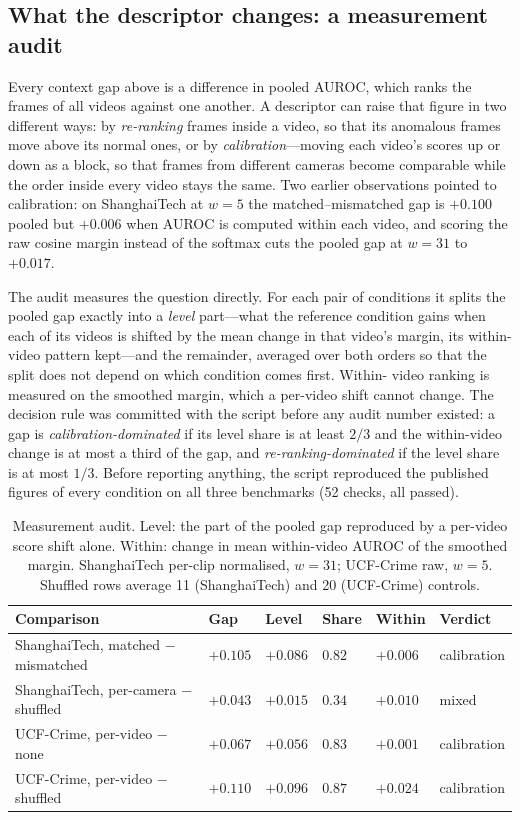 \documentclass[a4paper,fleqn]{cas-sc}
\begin{document}
\subsection{What the descriptor changes: a measurement audit}
\label{sec:res-audit}
Every context gap above is a difference in pooled AUROC, which ranks the frames
of all videos against one another. A descriptor can raise that figure in two
different ways: by \emph{re-ranking} frames inside a video, so that its
anomalous frames move above its normal ones, or by \emph{calibration}---moving
each video's scores up or down as a block, so that frames from different cameras
become comparable while the order inside every video stays the same. Two earlier
observations pointed to calibration: on ShanghaiTech at $w{=}5$ the
matched--mismatched gap is $+0.100$ pooled but $+0.006$ when AUROC is computed
within each video, and scoring the raw cosine margin instead of the softmax cuts
the pooled gap at $w{=}31$ to $+0.017$.

The audit measures the question directly. For each pair of conditions it splits
the pooled gap exactly into a \emph{level} part---what the reference condition
gains when each of its videos is shifted by the mean change in that video's
margin, its within-video pattern kept---and the remainder, averaged over both
orders so that the split does not depend on which condition comes first. Within-
video ranking is measured on the smoothed margin, which a per-video shift cannot
change. The decision rule was committed with the script before any audit number
existed: a gap is \emph{calibration-dominated} if its level share is at least
$2/3$ and the within-video change is at most a third of the gap, and
\emph{re-ranking-dominated} if the level share is at most $1/3$. Before
reporting anything, the script reproduced the published figures of every
condition on all three benchmarks (52 checks, all passed).

\begin{table}[width=\linewidth,cols=6,pos=h]
\caption{Measurement audit. Level: the part of the pooled gap reproduced by a
per-video score shift alone. Within: change in mean within-video AUROC of the
smoothed margin. ShanghaiTech per-clip normalised, $w{=}31$; UCF-Crime raw,
$w{=}5$. Shuffled rows average 11 (ShanghaiTech) and 20 (UCF-Crime) controls.}
\label{tbl:audit}
\begin{tabularx}{\linewidth}{@{}Z l l l l l@{}}
\toprule
\textbf{Comparison} & \textbf{Gap} & \textbf{Level} & \textbf{Share} & \textbf{Within} & \textbf{Verdict} \\
\midrule
ShanghaiTech, matched $-$ mismatched & $+0.105$ & $+0.086$ & $0.82$ & $+0.006$ & calibration \\
ShanghaiTech, per-camera $-$ shuffled & $+0.043$ & $+0.015$ & $0.34$ & $+0.010$ & mixed \\
UCF-Crime, per-video $-$ none & $+0.067$ & $+0.056$ & $0.83$ & $+0.001$ & calibration \\
UCF-Crime, per-video $-$ shuffled & $+0.110$ & $+0.096$ & $0.87$ & $+0.024$ & calibration \\
\bottomrule
\end{tabularx}
\end{table}
\end{document}
